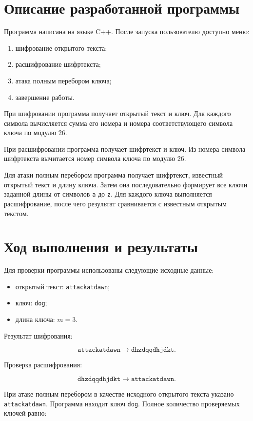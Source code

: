 \documentclass[a4paper,14pt,oneside]{extarticle}
\begin{document}
\section{Описание разработанной программы}

Программа написана на языке C++. После запуска пользователю доступно меню:

\begin{enumerate}
\item шифрование открытого текста;
\item расшифрование шифртекста;
\item атака полным перебором ключа;
\item завершение работы.
\end{enumerate}

При шифровании программа получает открытый текст и ключ. Для каждого символа
вычисляется сумма его номера и номера соответствующего символа ключа по
модулю 26.

При расшифровании программа получает шифртекст и ключ. Из номера символа
шифртекста вычитается номер символа ключа по модулю 26.

Для атаки полным перебором программа получает шифртекст, известный открытый
текст и длину ключа. Затем она последовательно формирует все ключи заданной
длины от символов \texttt{a} до \texttt{z}. Для каждого ключа выполняется
расшифрование, после чего результат сравнивается с известным открытым
текстом.

\section{Ход выполнения и результаты}

Для проверки программы использованы следующие исходные данные:

\begin{itemize}
\item открытый текст: \texttt{attackatdawn};
\item ключ: \texttt{dog};
\item длина ключа: $m=3$.
\end{itemize}

Результат шифрования:

\[
\texttt{attackatdawn}\longrightarrow\texttt{dhzdqqdhjdkt}.
\]

Проверка расшифрования:

\[
\texttt{dhzdqqdhjdkt}\longrightarrow\texttt{attackatdawn}.
\]

При атаке полным перебором в качестве исходного открытого текста указано
\texttt{attackatdawn}. Программа находит ключ \texttt{dog}. Полное количество
проверяемых ключей равно:
\end{document}
